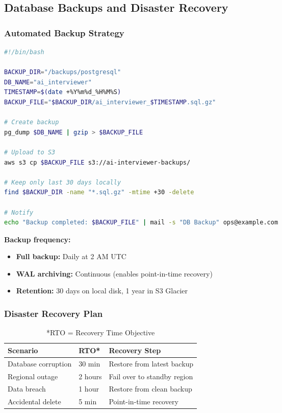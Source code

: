 \documentclass[12pt,a4paper,oneside]{article}
\begin{document}
{{\subsection{Database Backups and Disaster Recovery}

\subsubsection{Automated Backup Strategy}

\begin{lstlisting}[language=bash, caption=backup.sh (Automated Daily Backup)]
#!/bin/bash

BACKUP_DIR="/backups/postgresql"
DB_NAME="ai_interviewer"
TIMESTAMP=$(date +%Y%m%d_%H%M%S)
BACKUP_FILE="$BACKUP_DIR/ai_interviewer_$TIMESTAMP.sql.gz"

# Create backup
pg_dump $DB_NAME | gzip > $BACKUP_FILE

# Upload to S3
aws s3 cp $BACKUP_FILE s3://ai-interviewer-backups/

# Keep only last 30 days locally
find $BACKUP_DIR -name "*.sql.gz" -mtime +30 -delete

# Notify
echo "Backup completed: $BACKUP_FILE" | mail -s "DB Backup" ops@example.com
\end{lstlisting}

\textbf{Backup frequency:}

\begin{itemize}
    \item \textbf{Full backup:} Daily at 2 AM UTC
    \item \textbf{WAL archiving:} Continuous (enables point-in-time recovery)
    \item \textbf{Retention:} 30 days on local disk, 1 year in S3 Glacier
\end{itemize}

\subsubsection{Disaster Recovery Plan}

\begin{table}[H]
\centering
\begin{tabular}{|p{2.5cm}|p{2.5cm}|p{6cm}|}
\hline
\textbf{Scenario} & \textbf{RTO*} & \textbf{Recovery Step} \\
\hline
Database corruption & 30 min & Restore from latest backup \\
\hline
Regional outage & 2 hours & Fail over to standby region \\
\hline
Data breach & 1 hour & Restore from clean backup \\
\hline
Accidental delete & 5 min & Point-in-time recovery \\
\hline
\end{tabular}
\caption{*RTO = Recovery Time Objective}
\end{table}

}}
\end{document}
